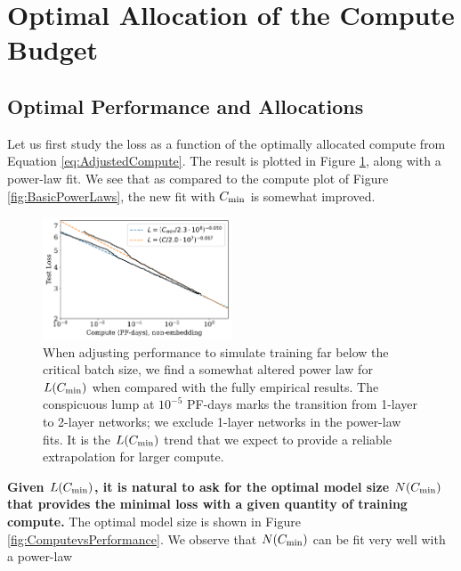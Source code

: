 \documentclass[english]{article}
\begin{document}
\section{Optimal Allocation of the Compute Budget}
\label{sec:OptimalCompute}

\subsection{Optimal Performance and Allocations}

Let us first study the loss as a function of the optimally allocated compute from Equation \eqref{eq:AdjustedCompute}.  The result is plotted in Figure \ref{fig:ComputeEfficientAdjusted}, along with a power-law fit.  We see that as compared to the compute plot of Figure \ref{fig:BasicPowerLaws}, the new fit with $C_{\rm min}$ is somewhat improved.

\begin{figure}
\centering{}
\includegraphics[width=0.5\textwidth]{ComputeEfficientFrontierWithAdjustment}  
\caption[Comparison between empirical and adjusted compute trends]{
When adjusting performance to simulate training far below the critical batch size, we find a somewhat altered power law for $L(C_{\rm min})$ when compared with the fully empirical results.  The conspicuous lump at $10^{-5}$ PF-days marks the transition from 1-layer to 2-layer networks; we exclude 1-layer networks in the power-law fits.  It is the $L(C_{\rm min})$ trend that we expect to provide a reliable extrapolation for larger compute.
\label{fig:ComputeEfficientAdjusted}}
\end{figure}

\textbf{Given $L(C_{\rm min})$, it is natural to ask for the optimal model size $N(C_{\rm min})$ that provides the minimal loss with a given quantity of training compute.}  The optimal model size is shown in Figure \ref{fig:ComputevsPerformance}.  We observe that $N(C_{\rm min})$ can be fit very well with a power-law
\end{document}
